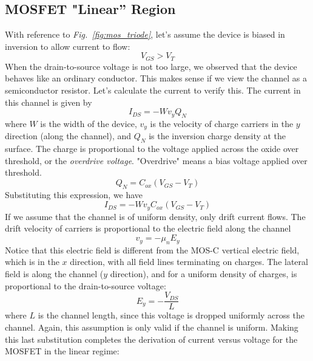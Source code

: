 \subsection{MOSFET "Linear'' Region}
With reference to \emph{Fig.~\ref{fig:mos_triode}}, let's assume the device is biased in inversion to allow current to flow:
    \begin{equation}
        {V_{GS}} > {V_{T}}
    \end{equation}
When the drain-to-source voltage is not too large, we observed that the device behaves like an ordinary conductor.  This makes sense if we view the channel as a semiconductor resistor.  Let's calculate the current to verify this.  
The current in this channel is given by
    \begin{equation}
        {I_{DS}} =  - W{v_y}{Q_N}
    \end{equation}
where $W$ is the width of the device, $v_y$ is the velocity of charge carriers in the $y$ direction (along the channel), and $Q_N$ is the inversion charge density at the surface.  
The charge is proportional to the voltage applied across the oxide over threshold, or the \emph{overdrive voltage}.  "Overdrive" means a bias voltage applied over threshold.
    \begin{equation}
        {Q_N} = {C_{ox}}({V_{GS}} - {V_{T}})
    \end{equation}
Substituting this expression, we have
    \begin{equation}
        {I_{DS}} =  - W{v_y}{C_{ox}}({V_{GS}} - {V_{T}})
    \end{equation}
If we assume that the channel is of uniform density, only drift current flows.  The drift velocity of carriers is proportional to the electric field along the channel
    \begin{equation}
        {v_y} =  - {\mu _n}{E_y}
    \end{equation}
Notice that this electric field is different from the MOS-C vertical electric field, which is in the $x$ direction, with all field lines terminating on charges.  The lateral field is along the channel ($y$ direction), and for a uniform density of charges, is proportional to the drain-to-source voltage:
    \begin{equation}
        {E_y} =  - \frac{{{V_{DS}}}}{L}
    \end{equation}
where $L$ is the channel length, since this voltage is dropped uniformly across the channel.  Again, this assumption is only valid if the channel is uniform.  Making this last substitution completes the derivation of current versus voltage for the MOSFET in the linear regime:

